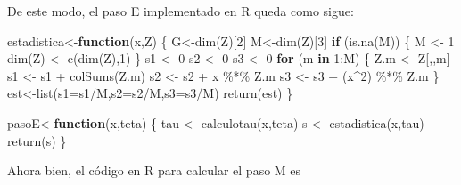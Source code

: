 \documentclass[
]{article}
\newenvironment{Shaded}{\begin{snugshade}}{\end{snugshade}}
\newcommand{\AttributeTok}[1]{\textcolor[rgb]{0.77,0.63,0.00}{#1}}
\newcommand{\ControlFlowTok}[1]{\textcolor[rgb]{0.13,0.29,0.53}{\textbf{#1}}}
\newcommand{\DecValTok}[1]{\textcolor[rgb]{0.00,0.00,0.81}{#1}}
\newcommand{\FunctionTok}[1]{\textcolor[rgb]{0.00,0.00,0.00}{#1}}
\newcommand{\NormalTok}[1]{#1}
\newcommand{\OtherTok}[1]{\textcolor[rgb]{0.56,0.35,0.01}{#1}}
\newcommand{\SpecialCharTok}[1]{\textcolor[rgb]{0.00,0.00,0.00}{#1}}
\begin{document}
De este modo, el paso E implementado en R queda como sigue:

\begin{Shaded}
\begin{Highlighting}[]
\NormalTok{estadistica}\OtherTok{\textless{}{-}}\ControlFlowTok{function}\NormalTok{(x,Z)}
\NormalTok{\{}
\NormalTok{  G}\OtherTok{\textless{}{-}}\FunctionTok{dim}\NormalTok{(Z)[}\DecValTok{2}\NormalTok{]}
\NormalTok{  M}\OtherTok{\textless{}{-}}\FunctionTok{dim}\NormalTok{(Z)[}\DecValTok{3}\NormalTok{]}
  \ControlFlowTok{if}\NormalTok{ (}\FunctionTok{is.na}\NormalTok{(M))  }
\NormalTok{  \{}
\NormalTok{    M }\OtherTok{\textless{}{-}} \DecValTok{1}
    \FunctionTok{dim}\NormalTok{(Z) }\OtherTok{\textless{}{-}} \FunctionTok{c}\NormalTok{(}\FunctionTok{dim}\NormalTok{(Z),}\DecValTok{1}\NormalTok{)}
\NormalTok{  \}}
\NormalTok{  s1 }\OtherTok{\textless{}{-}} \DecValTok{0}
\NormalTok{  s2 }\OtherTok{\textless{}{-}} \DecValTok{0}
\NormalTok{  s3 }\OtherTok{\textless{}{-}} \DecValTok{0}
  \ControlFlowTok{for}\NormalTok{ (m }\ControlFlowTok{in} \DecValTok{1}\SpecialCharTok{:}\NormalTok{M)}
\NormalTok{  \{}
\NormalTok{    Z.m }\OtherTok{\textless{}{-}}\NormalTok{ Z[,,m]}
\NormalTok{    s1 }\OtherTok{\textless{}{-}}\NormalTok{ s1 }\SpecialCharTok{+} \FunctionTok{colSums}\NormalTok{(Z.m)}
\NormalTok{    s2 }\OtherTok{\textless{}{-}}\NormalTok{ s2 }\SpecialCharTok{+}\NormalTok{ x }\SpecialCharTok{\%*\%}\NormalTok{ Z.m}
\NormalTok{    s3 }\OtherTok{\textless{}{-}}\NormalTok{ s3 }\SpecialCharTok{+}\NormalTok{ (x}\SpecialCharTok{\^{}}\DecValTok{2}\NormalTok{) }\SpecialCharTok{\%*\%}\NormalTok{ Z.m}
\NormalTok{  \}}
\NormalTok{  est}\OtherTok{\textless{}{-}}\FunctionTok{list}\NormalTok{(}\AttributeTok{s1=}\NormalTok{s1}\SpecialCharTok{/}\NormalTok{M,}\AttributeTok{s2=}\NormalTok{s2}\SpecialCharTok{/}\NormalTok{M,}\AttributeTok{s3=}\NormalTok{s3}\SpecialCharTok{/}\NormalTok{M)}
  \FunctionTok{return}\NormalTok{(est)}
\NormalTok{\}}

\NormalTok{pasoE}\OtherTok{\textless{}{-}}\ControlFlowTok{function}\NormalTok{(x,teta)}
\NormalTok{\{}
\NormalTok{  tau }\OtherTok{\textless{}{-}} \FunctionTok{calculotau}\NormalTok{(x,teta)}
\NormalTok{  s }\OtherTok{\textless{}{-}} \FunctionTok{estadistica}\NormalTok{(x,tau)}
  \FunctionTok{return}\NormalTok{(s)}
\NormalTok{\}}
\end{Highlighting}
\end{Shaded}

Ahora bien, el código en R para calcular el paso M es
\end{document}
